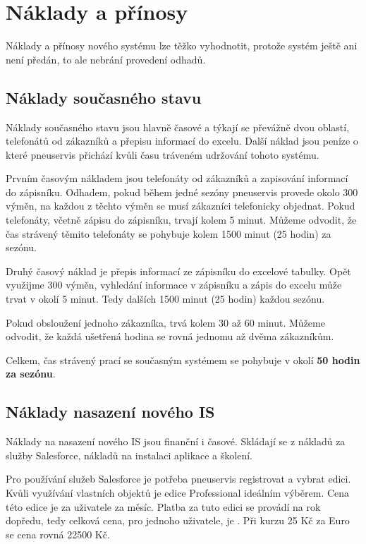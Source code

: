 \section{Náklady a přínosy}
Náklady a přínosy nového systému lze těžko vyhodnotit, protože systém ještě ani není předán, to ale nebrání provedení odhadů.
\subsection{Náklady současného stavu}
Náklady současného stavu jsou hlavně časové a týkají se převážně dvou oblastí, telefonátů od zákazníků a přepisu informací do excelu. Další náklad jsou peníze o které pneuservis přichází kvůli času tráveném udržování tohoto systému.

Prvním časovým nákladem jsou telefonáty od zákazníků a zapisování informací do zápisníku. Odhadem, pokud během jedné sezóny pneuservis provede okolo 300 výměn, na každou z těchto výměn se musí zákazníci telefonicky objednat. Pokud telefonáty, včetně zápisu do zápisníku, trvají kolem 5 minut. Můžeme odvodit, že čas strávený těmito telefonáty se pohybuje kolem 1500 minut (25 hodin) za sezónu.

Druhý časový náklad je přepis informací ze zápisníku do excelové tabulky. Opět využijme 300 výměn, vyhledání informace v zápisníku a zápis do excelu může trvat v okolí 5 minut. Tedy dalších 1500 minut (25 hodin) každou sezónu.

Pokud obsloužení jednoho zákazníka, trvá kolem 30 až 60 minut. Můžeme odvodit, že každá ušetřená hodina se rovná jednomu až dvěma zákazníkům.

Celkem, čas strávený prací se současným systémem se pohybuje v okolí \textbf{50 hodin za sezónu}.
\subsection{Náklady nasazení nového IS} \label{NakladyNasazeni}
Náklady na nasazení nového IS jsou finanční i časové. Skládají se z nákladů za služby Salesforce, nákladů na instalaci aplikace a školení.

Pro používání služeb Salesforce je potřeba pneuservis registrovat a vybrat edici. Kvůli využívání vlastních objektů je edice Professional ideálním výběrem. Cena této edice je  za uživatele za měsíc. Platba za tuto edici se provádí na rok dopředu, tedy celková cena, pro jednoho uživatele, je . Při kurzu 25 Kč za Euro se cena rovná 22500 Kč.

